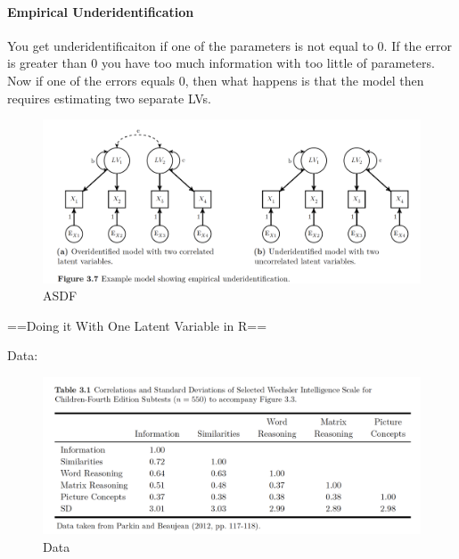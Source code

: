 \documentclass[]{book}
\let\oldparagraph\paragraph
\renewcommand{\paragraph}[1]{\oldparagraph{#1}\mbox{}}
\theoremstyle{definition}
\theoremstyle{definition}
\theoremstyle{definition}
\theoremstyle{remark}
\begin{document}
\paragraph{Empirical
Underidentification}\label{empirical-underidentification}

You get underidentificaiton if one of the parameters is not equal to 0.
If the error is greater than 0 you have too much information with too
little of parameters. Now if one of the errors equals 0, then what
happens is that the model then requires estimating two separate LVs.

\begin{figure}
\centering
\includegraphics{img/beaupath10.png}
\caption{ASDF}
\end{figure}

==Doing it With One Latent Variable in R==

Data:

\begin{figure}
\centering
\includegraphics{img/beaupath11.png}
\caption{Data}
\end{figure}
\end{document}
